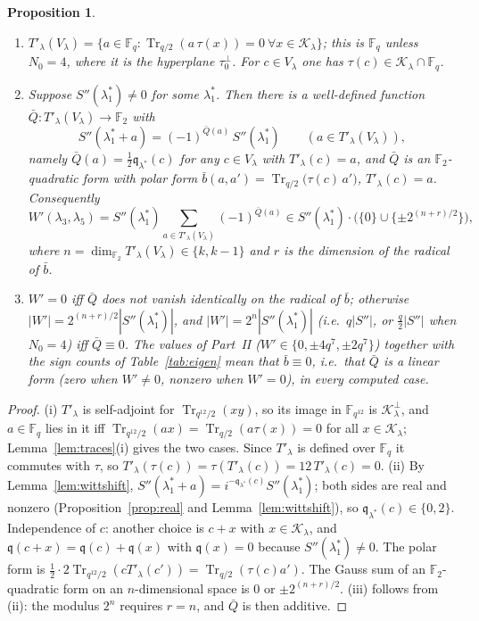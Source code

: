 \documentclass[12pt,a4paper]{amsart}
\newtheorem{proposition}[theorem]{Proposition}
\theoremstyle{definition}
\newcommand{\F}{\mathbb{F}}
\newcommand{\Tr}{\operatorname{Tr}}
\newcommand{\Kk}{\mathcal{K}}
\newcommand{\qq}{\mathfrak{q}}
\newcommand{\Spp}{S''}
\begin{document}
\begin{proposition}\label{prop:phase}
\begin{enumerate}[label=\textup{(\roman*)},leftmargin=2em]
\item $T'_\lambda(V_\lambda)=\{a\in\F_q:\Tr_{q/2}(a\,\tau(x))=0\ \forall x\in\Kk_\lambda\}$; this is $\F_q$ unless $N_0=4$, where it is the hyperplane $\tau_0^\perp$. For $c\in V_\lambda$ one has $\tau(c)\in\Kk_\lambda\cap\F_q$.
\item Suppose $\Spp(\lambda_1^*)\ne0$ for some $\lambda_1^*$. Then there is a well-defined function $\bar Q:T'_\lambda(V_\lambda)\to\F_2$ with
\[
\Spp(\lambda_1^*+a)=(-1)^{\bar Q(a)}\,\Spp(\lambda_1^*)\qquad(a\in T'_\lambda(V_\lambda)),
\]
namely $\bar Q(a)=\frac12\qq_{\lambda^*}(c)$ for any $c\in V_\lambda$ with $T'_\lambda(c)=a$, and $\bar Q$ is an $\F_2$-quadratic form with polar form $\bar b(a,a')=\Tr_{q/2}\bigl(\tau(c)\,a'\bigr)$, $T'_\lambda(c)=a$. Consequently
\[
W'(\lambda_3,\lambda_5)=\Spp(\lambda_1^*)\sum_{a\in T'_\lambda(V_\lambda)}(-1)^{\bar Q(a)}\in\Spp(\lambda_1^*)\cdot\bigl(\{0\}\cup\{\pm2^{(n+r)/2}\}\bigr),
\]
where $n=\dim_{\F_2}T'_\lambda(V_\lambda)\in\{k,k-1\}$ and $r$ is the dimension of the radical of $\bar b$.
\item $W'=0$ iff $\bar Q$ does not vanish identically on the radical of $\bar b$; otherwise $|W'|=2^{(n+r)/2}|\Spp(\lambda_1^*)|$, and $|W'|=2^n|\Spp(\lambda_1^*)|$ (i.e.\ $q|\Spp|$, or $\frac q2|\Spp|$ when $N_0=4$) iff $\bar Q\equiv0$. The values of Part~II ($W'\in\{0,\pm4q^7,\pm2q^7\}$) together with the sign counts of Table~\ref{tab:eigen} mean that $\bar b\equiv0$, i.e.\ that $\bar Q$ is a linear form (zero when $W'\ne0$, nonzero when $W'=0$), in every computed case.
\end{enumerate}
\end{proposition}
\begin{proof}
(i) $T'_\lambda$ is self-adjoint for $\Tr_{q^{12}/2}(xy)$, so its image in $\F_{q^{12}}$ is $\Kk_\lambda^\perp$, and $a\in\F_q$ lies in it iff $\Tr_{q^{12}/2}(ax)=\Tr_{q/2}(a\tau(x))=0$ for all $x\in\Kk_\lambda$; Lemma~\ref{lem:traces}(i) gives the two cases. Since $T'_\lambda$ is defined over $\F_q$ it commutes with $\tau$, so $T'_\lambda(\tau(c))=\tau(T'_\lambda(c))=12\,T'_\lambda(c)=0$. (ii) By Lemma~\ref{lem:wittshift}, $\Spp(\lambda_1^*+a)=i^{-\qq_{\lambda^*}(c)}\Spp(\lambda_1^*)$; both sides are real and nonzero (Proposition~\ref{prop:real} and Lemma~\ref{lem:wittshift}), so $\qq_{\lambda^*}(c)\in\{0,2\}$. Independence of $c$: another choice is $c+x$ with $x\in\Kk_\lambda$, and $\qq(c+x)=\qq(c)+\qq(x)$ with $\qq(x)=0$ because $\Spp(\lambda_1^*)\ne0$. The polar form is $\frac12\cdot2\Tr_{q^{12}/2}(cT'_\lambda(c'))=\Tr_{q/2}(\tau(c)a')$. The Gauss sum of an $\F_2$-quadratic form on an $n$-dimensional space is $0$ or $\pm2^{(n+r)/2}$. (iii) follows from (ii): the modulus $2^n$ requires $r=n$, and $\bar Q$ is then additive.
\end{proof}
\end{document}
